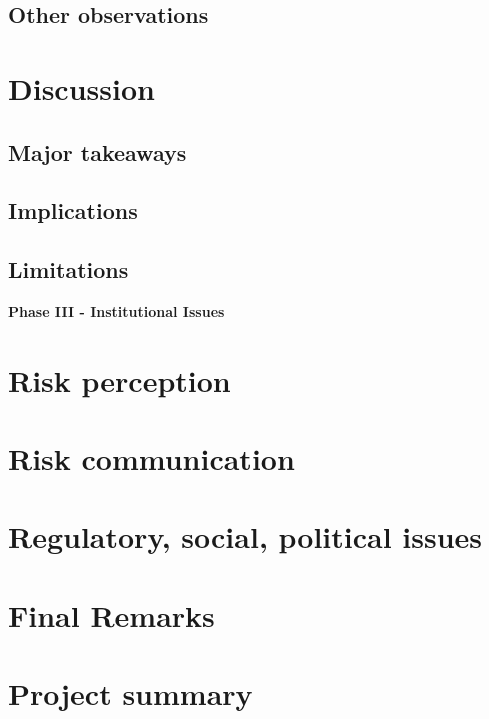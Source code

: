 \documentclass[11pt,a4paper]{article}
\begin{document}
\subsection{Other observations}

\newpage

\section{Discussion} 
\subsection{Major takeaways}
\subsection{Implications}
\subsection{Limitations}

\newpage

\begin{center}
    \textbf{\Large Phase III - Institutional Issues}
\end{center}

\newpage

\section{Risk perception}

\newpage

\section{Risk communication}

\newpage

\section{Regulatory, social, political issues}

\newpage

\section{Final Remarks}

\newpage

\section{Project summary}
\end{document}
